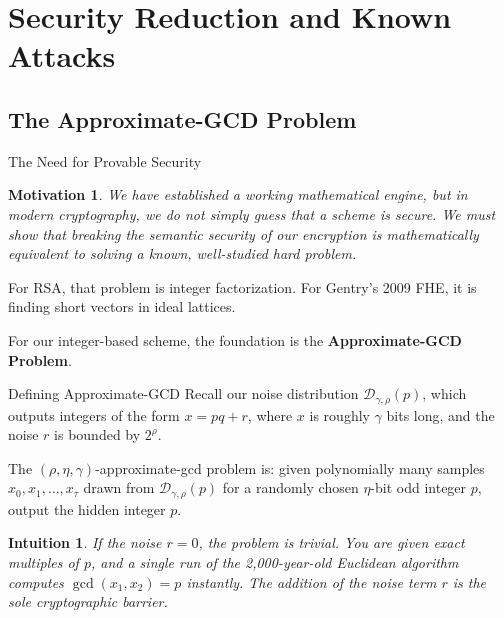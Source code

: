 \documentclass[10pt]{beamer}
\newtheorem{intuition}{Intuition}
\newtheorem{motivation}{Motivation}
\begin{document}

\section{Security Reduction and Known Attacks}

\subsection{The Approximate-GCD Problem}

\begin{frame}{The Need for Provable Security}
    \begin{motivation}
    We have established a working mathematical engine, but in modern cryptography, we do not simply \textit{guess} that a scheme is secure. We must show that breaking the semantic security of our encryption is mathematically equivalent to solving a known, well-studied hard problem.
    \end{motivation}
    \pause
    
    \vspace{0.3cm}
    For RSA, that problem is integer factorization. For Gentry's 2009 FHE, it is finding short vectors in ideal lattices.
    \pause
    
    \vspace{0.3cm}
    For our integer-based scheme, the foundation is the \textbf{Approximate-GCD Problem}.
\end{frame}

\begin{frame}{Defining Approximate-GCD}
    Recall our noise distribution $\mathcal{D}_{\gamma,\rho}(p)$, which outputs integers of the form $x = pq + r$, where $x$ is roughly $\gamma$ bits long, and the noise $r$ is bounded by $2^\rho$.
    \pause

    \vspace{0.3cm}
    \begin{definition}
    The $(\rho, \eta, \gamma)$-approximate-gcd problem is: given polynomially many samples $x_0, x_1, \dots, x_\tau$ drawn from $\mathcal{D}_{\gamma,\rho}(p)$ for a randomly chosen $\eta$-bit odd integer $p$, output the hidden integer $p$.
    \end{definition}
    \pause
    
    \vspace{0.3cm}
    \begin{intuition}
    If the noise $r=0$, the problem is trivial. You are given exact multiples of $p$, and a single run of the 2,000-year-old Euclidean algorithm computes $\gcd(x_1, x_2) = p$ instantly. The addition of the noise term $r$ is the sole cryptographic barrier.
    \end{intuition}
\end{frame}
\end{document}
